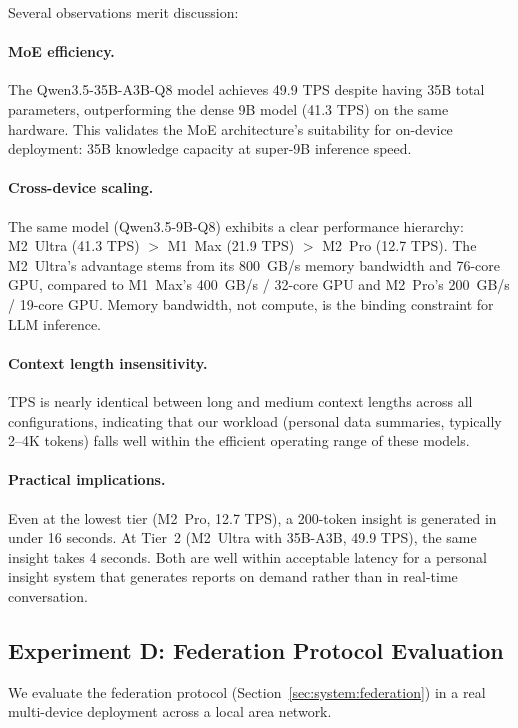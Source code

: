 \documentclass[11pt,a4paper]{article}
\begin{document}
Several observations merit discussion:

\paragraph{MoE efficiency.} The Qwen3.5-35B-A3B-Q8 model achieves 49.9 TPS
despite having 35B total parameters, outperforming the dense 9B model (41.3
TPS) on the same hardware. This validates the MoE architecture's suitability
for on-device deployment: 35B knowledge capacity at super-9B inference speed.

\paragraph{Cross-device scaling.} The same model (Qwen3.5-9B-Q8) exhibits a
clear performance hierarchy: M2~Ultra (41.3 TPS) $>$ M1~Max (21.9 TPS) $>$
M2~Pro (12.7 TPS). The M2~Ultra's advantage stems from its 800~GB/s memory
bandwidth and 76-core GPU, compared to M1~Max's 400~GB/s / 32-core GPU and
M2~Pro's 200~GB/s / 19-core GPU. Memory bandwidth, not compute, is the
binding constraint for LLM inference.

\paragraph{Context length insensitivity.} TPS is nearly identical between
long and medium context lengths across all configurations, indicating that
our workload (personal data summaries, typically 2--4K tokens) falls well
within the efficient operating range of these models.

\paragraph{Practical implications.} Even at the lowest tier (M2~Pro, 12.7
TPS), a 200-token insight is generated in under 16 seconds. At Tier~2
(M2~Ultra with 35B-A3B, 49.9 TPS), the same insight takes 4 seconds. Both
are well within acceptable latency for a personal insight system that
generates reports on demand rather than in real-time conversation.


\subsection{Experiment D: Federation Protocol Evaluation}
\label{sec:results:federation}

We evaluate the federation protocol (Section~\ref{sec:system:federation})
in a real multi-device deployment across a local area network.
\end{document}
